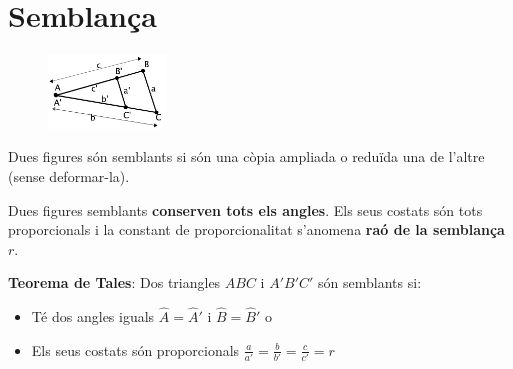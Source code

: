 \begin{iniaval}
\end{iniaval}

\newpage
\section{Semblança}

\begin{theorybox}
	\begin{figure}
		\centering
			\includegraphics[width=0.28\textwidth]{img-09/trig-semblant}
	\end{figure}
	
	Dues figures són semblants si són una còpia ampliada o reduïda una de l'altre (sense deformar-la). 
	
	Dues figures semblants \textbf{conserven tots els angles}. Els seus costats són tots proporcionals i la constant de proporcionalitat s'anomena \textbf{raó de la semblança} $r$.
	
	\textbf{Teorema de Tales}: Dos triangles $ABC$ i $A'B'C'$ són semblants si: 
	
	\begin{itemize}
		\item Té dos angles iguals $\hat A = \hat A'$  i $\hat B = \hat B'$ o
		\item Els seus costats són proporcionals $\frac{a}{a'}=\frac{b}{b'}=\frac{c}{c'}=r$
	\end{itemize}
	

\end{theorybox}

